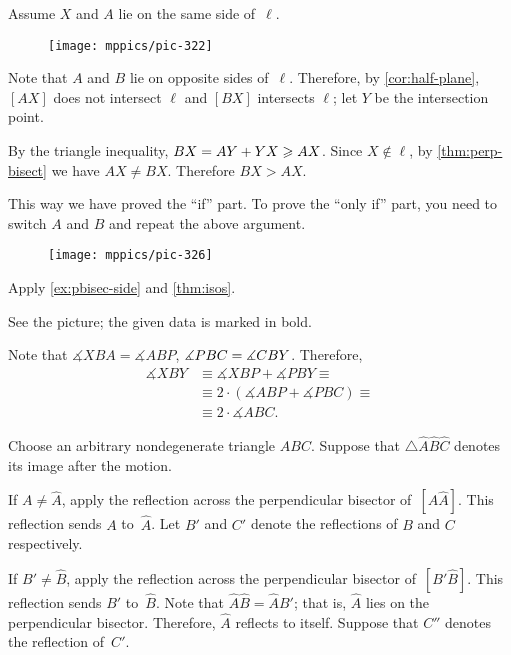 Assume $X$ and $A$ lie on the same side of~$\ell$.

\begin{wrapfigure}{r}{27mm}
\vskip-4mm
\centering
\texttt{[image: mppics/pic-322]}
\end{wrapfigure}

Note that $A$ and $B$ lie on opposite sides of~$\ell$.
Therefore, by \ref{cor:half-plane}, 
$[AX]$ does not intersect $\ell$ 
and $[BX]$ intersects $\ell$;
let $Y$ be the intersection point.

By the triangle inequality, $BX=AY+YX\geqslant AX$.
Since $X\notin\ell$, by \ref{thm:perp-bisect} we have $AX\ne BX$.
Therefore $BX> AX$.

This way we have proved the ``if'' part.
To prove the ``only if'' part, you need to switch $A$ and $B$ and
repeat the above argument.

\begin{wrapfigure}{r}{27mm}
\vskip-4mm
\centering
\texttt{[image: mppics/pic-326]}
\end{wrapfigure}

Apply \ref{ex:pbisec-side} and \ref{thm:isos}.

See the picture; the given data is marked in bold.

Note that $\measuredangle XBA=\measuredangle ABP$, $\measuredangle PBC=\measuredangle CBY$.
Therefore,
\begin{align*}
\measuredangle XBY
&\equiv
\measuredangle XBP+\measuredangle PBY\equiv
\\
&\equiv
 2\cdot(\measuredangle ABP+\measuredangle PBC)\equiv
\\
&
\equiv
 2\cdot \measuredangle ABC.
\end{align*}

\vskip-4mm

Choose an arbitrary nondegenerate triangle $ABC$.
Suppose that $\triangle \hat A \hat B\hat C$ denotes its image after the motion.

If $A\ne \hat A$, apply the reflection across the perpendicular bisector of~$[A\hat A]$.
This reflection sends $A$ to~$\hat A$.
Let $B'$ and $C'$ denote the reflections of $B$ and $C$ respectively.

If $B'\ne \hat B$, apply the reflection across the perpendicular bisector of~$[B'\hat B]$.
This reflection sends $B'$ to~$\hat B$.
Note that $\hat A\hat B=\hat AB'$;
that is, $\hat A$ lies on the perpendicular bisector. 
Therefore, $\hat A$ reflects to itself.
Suppose that $C''$ denotes the reflection of~$C'$.

